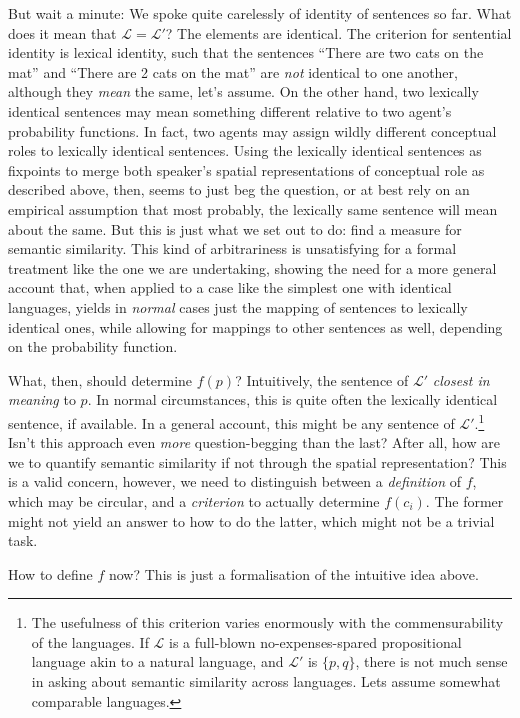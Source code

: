 \documentclass[11pt, a4paper]{scrartcl}
\renewcommand{\i}[1]{\emph{#1}}
\renewcommand{\L}{\mathcal{L}}
\begin{document}
But wait a minute: We spoke quite carelessly of identity of sentences so far. What does it mean that $\L = \L'$? The elements are identical. The criterion for sentential identity is lexical identity, such that the sentences ``There are two cats on the mat'' and ``There are 2 cats on the mat'' are \i{not} identical to one another, although they \i{mean} the same, let's assume. On the other hand, two lexically identical sentences may mean something different relative to two agent's probability functions. In fact, two agents may assign wildly different conceptual roles to lexically identical sentences. Using the lexically identical sentences as fixpoints to merge both speaker's spatial representations of conceptual role as described above, then, seems to just beg the question, or at best rely on an empirical assumption that most probably, the lexically same sentence will mean about the same. But this is just what we set out to do: find a measure for semantic similarity. This kind of arbitrariness is unsatisfying for a formal treatment like the one we are undertaking, showing the need for a more general account that, when applied to a case like the simplest one with identical languages, yields in \i{normal} cases just the mapping of sentences to lexically identical ones, while allowing for mappings to other sentences as well, depending on the probability function.

What, then, should determine $f(p)$? Intuitively, the sentence of $\L'$ \i{closest in meaning} to $p$. In normal circumstances, this is quite often the lexically identical sentence, if available. In a general account, this might be any sentence of $\L'$.\footnote{The usefulness of this criterion varies enormously with the commensurability of the languages. If $\L$ is a full-blown no-expenses-spared propositional language akin to a natural language, and $\L'$ is $\{p, q\}$, there is not much sense in asking about semantic similarity across languages. Lets assume somewhat comparable languages.} Isn't this approach even \i{more} question-begging than the last? After all, how are we to quantify semantic similarity if not through the spatial representation? This is a valid concern, however, we need to distinguish between a \i{definition} of $f$, which may be circular, and a \i{criterion} to actually determine $f(c_i)$. The former might not yield an answer to how to do the latter, which might not be a trivial task.

How to define $f$ now? This is just a formalisation of the intuitive idea above. 
\end{document}
